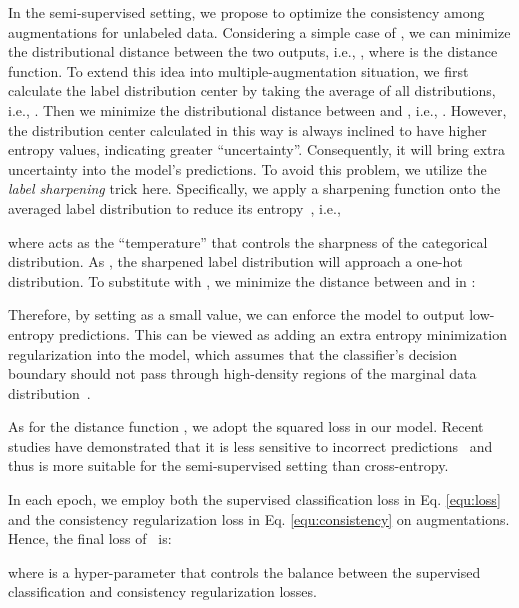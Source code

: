 { 
In the semi-supervised setting, we propose to optimize the consistency among  augmentations for unlabeled data. Considering a simple case of , we can
minimize the distributional distance between the two outputs, i.e.,
,
where  is the distance function. 
To extend this idea into multiple-augmentation situation, we first 
calculate the label distribution center by taking the average of all distributions, i.e., 
 .
Then we minimize the distributional distance between  and , i.e., .
\hide{

}
However, the distribution center calculated in this way is always inclined to have higher entropy values, indicating greater ``uncertainty''. 
Consequently, it will bring extra uncertainty into the model's predictions. 
To avoid this problem, we utilize the \textit{label sharpening} trick here.
Specifically, we apply a sharpening function onto the averaged label distribution to reduce its entropy~\cite{berthelot2019mixmatch}, i.e.,

where  acts as the ``temperature'' that controls the sharpness of the categorical distribution. 
As , the sharpened label distribution will approach a one-hot distribution. 
To substitute  with , we minimize the distance between   and  in \model:



Therefore, by setting  as a small value, we can enforce the model to output low-entropy predictions. 
This can be viewed as adding an extra entropy minimization regularization into the model, which assumes that the classifier's decision boundary should not pass through high-density regions of the marginal data distribution~\cite{grandvalet2005semi}. 

As for the distance function , we adopt the squared  loss  in our model. 
Recent studies have demonstrated that it is less sensitive to incorrect predictions~\cite{berthelot2019mixmatch} and thus is more suitable for the semi-supervised setting than cross-entropy. 



In each epoch, we employ both the supervised classification loss in Eq. \ref{equ:loss} and the consistency regularization loss in Eq. \ref{equ:consistency} on  augmentations. 
Hence, the final loss of \model\ is:

where  is a hyper-parameter that controls the balance between the supervised classification and consistency regularization losses.


}
